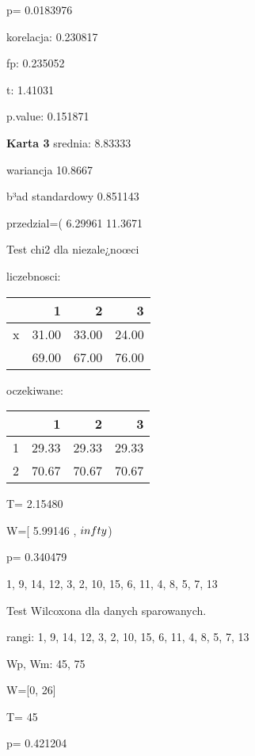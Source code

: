\documentclass[a4paper,12pt]{article}
\begin{document}
\begin{multicols}{3}
  p= 0.0183976 \vspace{1cm} 

  korelacja: 0.230817
     
     fp: 0.235052
     
     t: 1.41031
     
     p.value: 0.151871 \vspace{1cm} 

  \textbf{Karta  3 } 
 srednia: 8.83333 
     
     wariancja 10.8667  
     
     b³ad standardowy 0.851143 
     
     przedzial=( 6.29961 11.3671 \vspace{1cm} 

  Test chi2 dla niezale¿noœci 
   
   liczebnosci: %
\begin{tabular}{rrrr}
  \hline
 & 1 & 2 & 3 \\
  \hline
x & 31.00 & 33.00 & 24.00 \\
   & 69.00 & 67.00 & 76.00 \\
   \hline
\end{tabular}
 
   
   oczekiwane: %
\begin{tabular}{rrrr}
  \hline
 & 1 & 2 & 3 \\
  \hline
1 & 29.33 & 29.33 & 29.33 \\
  2 & 70.67 & 70.67 & 70.67 \\
   \hline
\end{tabular}
 
   
   T= 2.15480 
   
   W=[ 5.99146 , $\\infty$) 
   
   p= 0.340479 \vspace{1cm} 

  1, 9, 14, 12, 3, 2, 10, 15, 6, 11, 4, 8, 5, 7, 13 

  Test Wilcoxona dla danych sparowanych. 
  
  rangi: 1, 9, 14, 12, 3, 2, 10, 15, 6, 11, 4, 8, 5, 7, 13 
  
  Wp, Wm:  45,  75 
  
  W=[0, 26]  
  
  T=  45 
  
  p= 0.421204 \vspace{1cm} 


\end{multicols}
\end{document}
